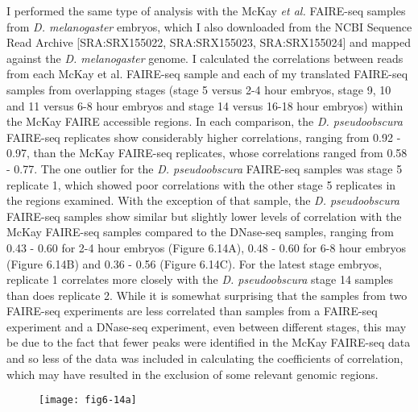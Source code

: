 I performed the same type of analysis with the McKay \emph{et al.} FAIRE-seq samples from \emph{D. melanogaster} embryos, which I also downloaded from the NCBI Sequence Read Archive [SRA:SRX155022, SRA:SRX155023, SRA:SRX155024] and mapped against the \emph{D. melanogaster} genome. I calculated the correlations between reads from each McKay et al. FAIRE-seq sample and each of my translated FAIRE-seq samples from overlapping stages (stage 5 versus 2-4 hour embryos, stage 9, 10 and 11 versus 6-8 hour embryos and stage 14 versus 16-18 hour embryos) within the McKay FAIRE accessible regions. In each comparison, the \emph{D. pseudoobscura} FAIRE-seq replicates show considerably higher correlations, ranging from 0.92 - 0.97, than the McKay FAIRE-seq replicates, whose correlations ranged from 0.58 - 0.77. The one outlier for the \emph{D. pseudoobscura} FAIRE-seq samples was stage 5 replicate 1, which showed poor correlations with the other stage 5 replicates in the regions examined. With the exception of that sample, the \emph{D. pseudoobscura} FAIRE-seq samples show similar but slightly lower levels of correlation with the McKay FAIRE-seq samples compared to the DNase-seq samples, ranging from 0.43 - 0.60 for 2-4 hour embryos (Figure 6.14A), 0.48 - 0.60 for 6-8 hour embryos (Figure 6.14B) and 0.36 - 0.56 (Figure 6.14C). For the latest stage embryos, replicate 1 correlates more closely with the \emph{D. pseudoobscura} stage 14 samples than does replicate 2. While it is somewhat surprising that the samples from two FAIRE-seq experiments are less correlated than samples from a FAIRE-seq experiment and a DNase-seq experiment, even between different stages, this may be due to the fact that fewer peaks were identified in the McKay FAIRE-seq data and so less of the data was included in calculating the coefficients of correlation, which may have resulted in the exclusion of some relevant genomic regions.

\begin{figure}[H]
\centering
\texttt{[image: fig6-14a]}
\label{Figure 6.14}
\end{figure}


